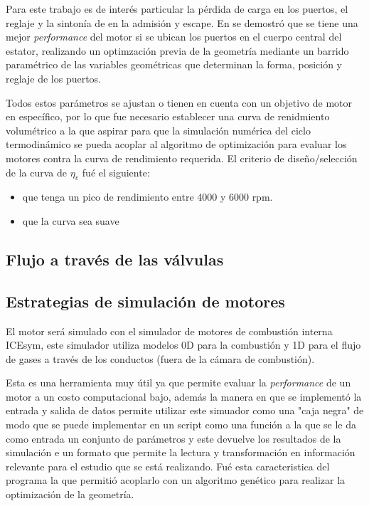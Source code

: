 Para este trabajo es de interés particular la pérdida de carga en los puertos,
el reglaje y la sintonía de en la admisión y escape.
%
En \cite{lopez13} se demostró que se tiene una mejor \emph{performance} del
motor si se ubican los puertos en el cuerpo central del estator, realizando un
optimzación previa de la geometría mediante un barrido paramétrico de las
variables geométricas que determinan la forma, posición y reglaje de los
puertos.
%

Todos estos parámetros se ajustan o tienen en cuenta con un objetivo de motor
en específico, por lo que fue necesario establecer una curva de renidmiento
volumétrico a la que aspirar para que la simulación numérica del ciclo
termodinámico se pueda acoplar al algoritmo de optimización para evaluar los
motores contra la curva de rendimiento requerida.
%
El criterio de diseño/selección de la curva de $\eta_v$ fué el siguiente:

\begin{itemize} \item que tenga un pico de rendimiento entre 4000 y 6000 rpm.
\item que la curva sea suave \end{itemize}

\subsection{Flujo a través de las válvulas}

\subsection{Estrategias de simulación de motores}
%
El motor será simulado con el simulador de motores de combustión interna
ICEsym, este simulador utiliza modelos 0D para la combustión y 1D para el flujo
de gases a través de los conductos (fuera de la cámara de combustión).

Esta es una herramienta muy útil ya que permite evaluar la \emph{performance}
de un motor a un costo computacional bajo, además la manera en que se
implementó la entrada y salida de datos permite utilizar este simuador como una
"caja negra" de modo que se puede implementar en un script como una función a
la que se le da como entrada un conjunto de parámetros y este devuelve los
resultados de la simulación e un formato que permite la lectura y
transformación en información relevante para el estudio que se está realizando.
%
Fué esta caracteristica del programa la que permitió acoplarlo con un algoritmo
genético para realizar la optimización de la geometría.


